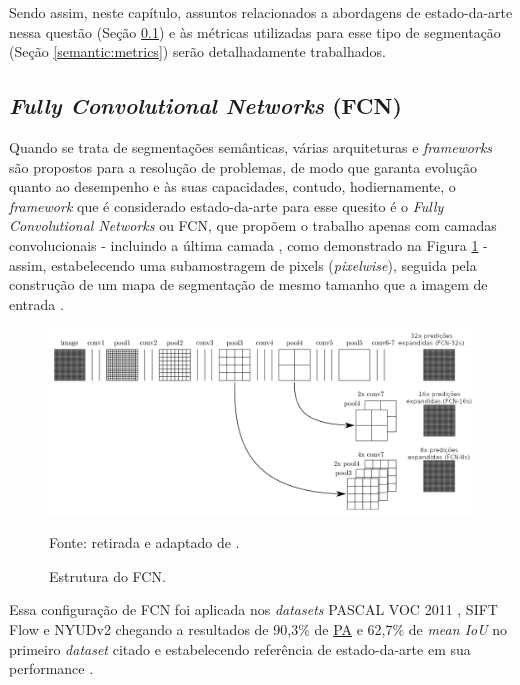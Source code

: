 Sendo assim, neste capítulo, assuntos relacionados a abordagens de estado-da-arte nessa questão (Seção \ref{semantic:FCN}) e às métricas utilizadas para esse tipo de segmentação (Seção \ref{semantic:metrics}) serão detalhadamente trabalhados.


\subsection{\textit{Fully Convolutional Networks} (FCN)}
\label{semantic:FCN}
Quando se trata de segmentações semânticas, várias arquiteturas e \textit{frameworks} são propostos para a resolução de problemas, de modo que garanta evolução quanto ao desempenho e às suas capacidades, contudo, hodiernamente, o \textit{framework} que é considerado estado-da-arte para esse quesito é o \textit{Fully Convolutional Networks} \cite{Shelhamer2016} ou FCN, que propõem o trabalho apenas com camadas convolucionais - incluindo a última camada \cite{Hesamian2019}, como demonstrado na Figura \ref{semantic:fig:5} - assim, estabelecendo uma subamostragem de pixels (\textit{pixelwise}), seguida pela construção de um mapa de segmentação de mesmo tamanho que a imagem de entrada \cite{Minaee2021, Zhang2018, Hesamian2019}.

\begin{figure}[H]
    \centering
    \caption{Estrutura do FCN.}
    \includegraphics[width=1\linewidth]{recursos/imagens/semantic/fcn_arch.png}
    \label{semantic:fig:5}

    Fonte: retirada e adaptado de \cite{Shelhamer2016}.
\end{figure}

\begin{sloppypar}
Essa configuração de FCN foi aplicada nos \textit{datasets} PASCAL VOC 2011 \cite{everingham2010pascal}, SIFT Flow \cite{Liu2011} e NYUDv2 \cite{Silberman:ECCV12} chegando a resultados de 90,3\% de \hyperref[semantic:pa]{PA} e 62,7\% de \textit{mean IoU} no primeiro \textit{dataset} citado \cite{Ghosh2019} e estabelecendo referência de estado-da-arte em sua performance \cite{Minaee2021}.
\end{sloppypar}

